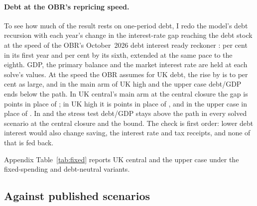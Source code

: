 \paragraph{Debt at the OBR's repricing speed.} To see how much of the \genDebtRuleYear{} result rests on one-period debt, I redo the model's debt recursion with each year's change in the interest-rate gap reaching the debt stock at the speed of the OBR's October~2026 debt interest ready reckoner \citep{obr2026efooct}: \genObrPassFirstPct{} per cent in its first year and \genObrPassSixthPct{} per cent by its sixth, extended at the same pace to the eighth. GDP, the primary balance and the market interest rate are held at each solve's values. At the speed the OBR assumes for UK debt, the rise by \genDebtRuleYear{} is \genRepriceRatioMinPct{} to \genRepriceRatioMaxPct{} per cent as large, and in the main arm of UK high and the upper case debt/GDP ends below the path. In UK central's main arm at the central closure the gap is \genUkCentralMainDebtRepricedThirtySixCentral{} points in place of \genUkCentralMainDebtPpThirtySixCentral{}; in UK high it is \genUkHighMainDebtRepricedThirtySixCentral{} points in place of \genUkHighMainDebtPpThirtySixCentral{}, and in the upper case \genKorinekMainDebtRepricedThirtySixCentral{} in place of \genKorinekMainDebtPpThirtySixCentral{}. In \Flat{} and the stress test debt/GDP stays above the path in every solved scenario at the central closure and the bound. The check is first order: lower debt interest would also change saving, the interest rate and tax receipts, and none of that is fed back.

Appendix Table~\ref{tab:fixed} reports UK central and the upper case under the fixed-spending and debt-neutral variants.

\subsection{Against published scenarios}
\label{sec:results-benchmarks}

